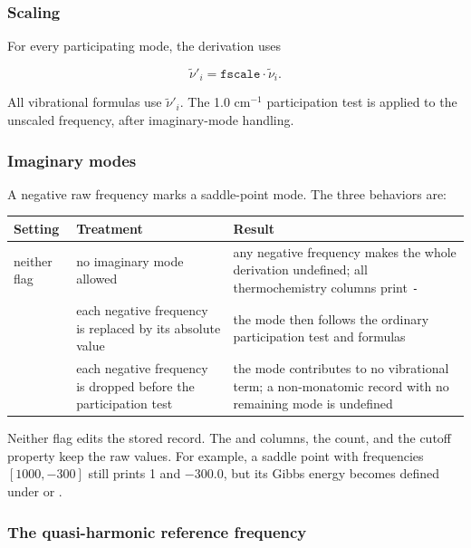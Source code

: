 \subsubsection*{Scaling}

For every participating mode, the derivation uses

\begin{equation}
\tilde{\nu}'_i = \texttt{fscale} \cdot \tilde{\nu}_i .
\end{equation}

All vibrational formulas use $\tilde{\nu}'_i$. The 1.0 cm$^{-1}$
participation test is applied to the unscaled frequency, after imaginary-mode
handling.

\subsubsection*{Imaginary modes}

A negative raw frequency marks a saddle-point mode. The three behaviors are:

\begin{center}
\begin{tabular}{@{}L{3.2cm}L{4.1cm}L{6.0cm}@{}}
\toprule
\textbf{Setting} & \textbf{Treatment} & \textbf{Result} \\
\midrule
neither flag & no imaginary mode allowed & any negative frequency makes the
whole derivation undefined; all thermochemistry columns print \texttt{-} \\
 & each negative frequency is replaced by its absolute value
& the mode then follows the ordinary participation test and formulas \\
 & each negative frequency is dropped before the
participation test & the mode contributes to no vibrational term; a
non-monatomic record with no remaining mode is undefined \\
\bottomrule
\end{tabular}
\end{center}

Neither flag edits the stored record. The  and  columns,
the  count, and the  cutoff property keep the raw values.
For example, a saddle point with frequencies $[1000, -300]$ still prints
 1 and  $-300.0$, but its Gibbs energy becomes defined
under  or .

\subsubsection*{The quasi-harmonic reference frequency}

